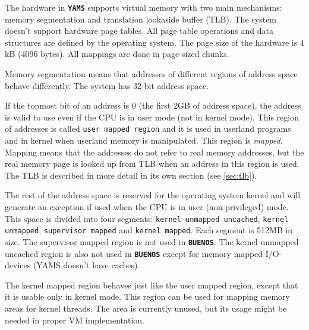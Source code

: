\documentclass[twoside,a4paper]{report}
\newcommand{\buenos}{\texttt{\textbf{BUENOS}}}
\newcommand{\yams}{\texttt{\textbf{YAMS}}}
\begin{document}
The hardware in \yams{} supports virtual memory with two main
mechanisms: memory segmentation and translation lookaside buffer
(TLB).   The system doesn't support hardware page
tables. All page table operations and data structures are defined by
the operating system. The page size  of the hardware is 4 kB (4096
bytes). All mappings are done in page sized chunks.

Memory segmentation   means that addresses of different regions of address space
behave differently. The system has 32-bit address space.

If the topmost bit of an address is 0 (the first 2GB of address
space), the address is valid to use even if the CPU is in user mode
(not in kernel mode). This region of addresses is called \texttt{user
mapped region} 
 and it is used in userland
programs and in kernel when userland memory is manipulated. This
region is \emph{mapped}.  Mapping  means that
the addresses do not refer to real memory addresses, but the real
memory page is looked up from TLB when an address in this region is
used. The TLB is described in more detail in its own section (see
\autoref{sec:tlb}).

The rest of the address space is reserved for the operating system
kernel and will generate an exception if used when the CPU is in user
(non-privileged) mode. This space is divided into four segments:
\texttt{kernel unmapped uncached}, \texttt{kernel unmapped},
\texttt{supervisor mapped} and \texttt{kernel mapped}. Each segment is
512MB in size. The supervisor mapped region is not used in \buenos{}.
The kernel unmapped uncached region is also not used in \buenos{}
except for memory mapped I/O-devices (YAMS doesn't have caches).

The kernel mapped region behaves just like the user mapped region,
except that it is usable only in kernel mode. This region can be used
for mapping memory areas for kernel threads. The area is currently
unused, but its usage might be needed in proper VM implementation.
\end{document}
